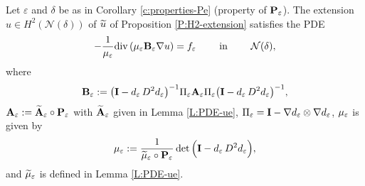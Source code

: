 \begin{proposition}\label{P:BVP}
Let $\varepsilon$ and $\delta$ be as in Corollary \ref{c:properties-Pe}
(property of $\bPe$).
The extension $u\in H^2({\mathcal N(\delta)})$ of $\wu$ of
Proposition \ref{P:H2-extension} satisfies the PDE
%
\[
-\frac{1}{\mue} \div { \mue \bBe \nabla u}  = \fe
\qquad \hbox{ in }\qquad  {\mathcal N(\delta)},
\]
%
where
%
\[
\bBe := \big(\bI - \wde \, D^2\wde \big)^{-1} \Pi_\varepsilon \bAe \Pi_\varepsilon
\big( \bI - \wde \, D^2\wde \big)^{-1} ,
\]
%
$\bAe:=\wbAe\circ\bPe$ with $\wbAe$ given in Lemma \ref{L:PDE-ue},
$\Pi_\varepsilon = \bI - \nabla\wde\otimes\nabla\wde$, $\mue$ is given by
%
\[
\mue := \frac{1}{\wmue\circ\bPe} \det\Big( \bI - \wde \, D^2\wde  \Big),
\]
%
and $\wmue$ is defined in Lemma \ref{L:PDE-ue}.
%
\end{proposition}
%
